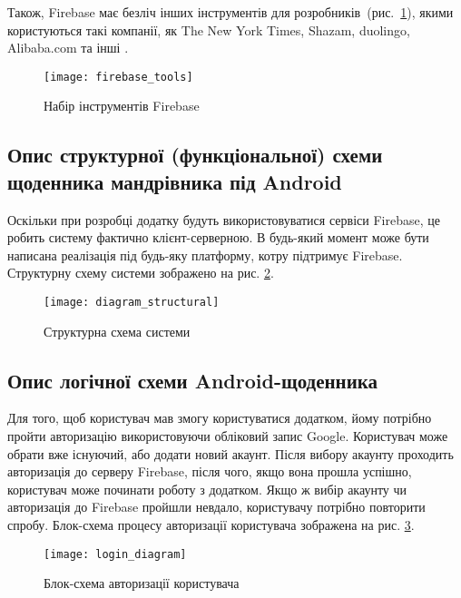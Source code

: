 \documentclass[../main.tex]{subfiles}
\begin{document}

Також, Firebase має безліч інших інструментів для розробників~(рис.~\ref{figure:firebase_tools}), якими користуються такі компанії, як The New York Times, Shazam, duolingo, Alibaba.com та інші \cite{firebase}.


\begin{figure}[H]
	\centering
	\texttt{[image: firebase\_tools]}
	\caption{Набір інструментів Firebase}
	\label{figure:firebase_tools}
\end{figure}

\subsection{Опис структурної (функціональної) схеми щоденника мандрівника під Android}
Оскільки при розробці додатку будуть використовуватися сервіси Firebase, це робить систему фактично клієнт-серверною. В будь-який момент може бути написана реалізація під будь-яку платформу, котру підтримує Firebase. Структурну схему системи зображено на рис. \ref{diagram:structural}.


\begin{figure}[H]
	\centering
	\texttt{[image: diagram\_structural]}
	\caption{Структурна схема системи}
	\label{diagram:structural}
\end{figure}

\subsection{Опис логічної схеми Android-щоденника}
Для того, щоб користувач мав змогу користуватися додатком, йому потрібно пройти авторизацію використовуючи обліковий запис Google. Користувач може обрати вже існуючий, або додати новий акаунт. Після вибору акаунту проходить авторизація до серверу Firebase, після чого, якщо вона прошла успішно, користувач може починати роботу з додатком. Якщо ж вибір акаунту чи авторизація до Firebase пройшли невдало, користувачу потрібно повторити спробу. Блок-схема процесу авторизації користувача зображена на рис. \ref{diagram:login}.

\begin{figure}[H]
	\centering
	\texttt{[image: login\_diagram]}
	\caption{Блок-схема авторизації користувача}
	\label{diagram:login}
\end{figure}
\end{document}
